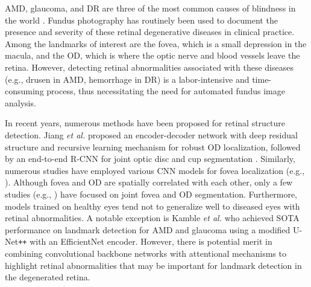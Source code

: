\documentclass[hidelinks,runningheads]{llncs}
\begin{document}
\Ac{AMD}, glaucoma, and \ac{DR} are three of the most common causes of blindness in the world \cite{steinmetz_causes_2021}.
Fundus photography has routinely been used to document the presence and severity of these retinal degenerative diseases in clinical practice.
Among the landmarks of interest are the fovea, which is a small depression in the macula, and the \ac{OD}, which is where the optic nerve and blood vessels leave the retina.
However, detecting retinal abnormalities associated with these diseases (e.g.,  drusen in \ac{AMD}, hemorrhage in \ac{DR}) is a labor-intensive and time-consuming process, thus necessitating the need for automated fundus image analysis.

In recent years, numerous methods have been proposed for retinal structure detection.
Jiang \emph{et al.} \cite{jiang_robust_2019} proposed an encoder-decoder network with deep residual structure and recursive learning mechanism for robust \ac{OD} localization, followed by an end-to-end \ac{R-CNN} for joint optic disc and cup segmentation \cite{jiang_jointrcnn_2020}.
Similarly, numerous studies have employed various \ac{CNN} models for fovea localization (e.g., \cite{sedai_multi-stage_2017,alais_fast_2020}).
Although fovea and \ac{OD} are spatially correlated with each other, only a few studies (e.g., \cite{yu_fast_2011,meyer_pixel-wise_2018}) have focused on joint fovea and \ac{OD} segmentation.
Furthermore, models trained on healthy eyes tend not to generalize well to diseased eyes with retinal abnormalities. A notable exception is Kamble \emph{et al.} \cite{kamble_optic_2020} who achieved \ac{SOTA} performance on landmark detection for \ac{AMD} and glaucoma using a modified U-Net\verb!++! with an EfficientNet encoder.
However, there is potential merit in combining convolutional backbone networks with attentional mechanisms \cite{vaswani_attention_2017} to highlight retinal abnormalities that may be important for landmark detection in the degenerated retina.
\end{document}
